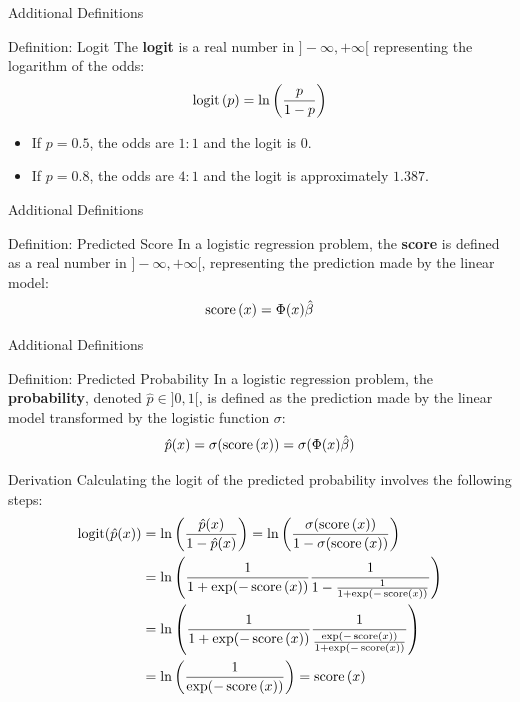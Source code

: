 \begin{frame}{Additional Definitions}
	\begin{block}{Definition: Logit}
		The \textbf{logit} is a real number in $]-\infty, +\infty[$ representing the logarithm of the odds:
		\begin{equation}
			\operatorname{logit}\left(p\right) = \ln\left(\frac{p}{1 - p}\right)
			\nonumber
		\end{equation}
	\end{block}
	\pause
	\begin{itemize}
		\item If $p=0.5$, the odds are $1:1$ and the logit is $0$.
		\item If $p=0.8$, the odds are $4:1$ and the logit is approximately $1.387$.
	\end{itemize}	
\end{frame}

\begin{frame}{Additional Definitions}
	\begin{block}{Definition: Predicted Score}
		In a logistic regression problem, the \textbf{score} is defined as a real number in $]-\infty, +\infty[$, representing the prediction made by the linear model:
		\begin{equation}
			\operatorname{score}\left(x\right) = \Phi(x) \hat{\beta}
			\nonumber
		\end{equation}
	\end{block}
\end{frame}

\begin{frame}{Additional Definitions}
	\begin{block}{Definition: Predicted Probability}
		In a logistic regression problem, the \textbf{probability}, denoted $\hat{p} \in ]0, 1[$, is defined as the prediction made by the linear model transformed by the logistic function $\sigma$:
		\begin{equation}
			\hat{p}(x) = \sigma(\operatorname{score}\left(x\right)) = \sigma(\Phi(x) \hat{\beta})
			\nonumber
		\end{equation}
	\end{block}
\end{frame}

\begin{frame}{Derivation}
	Calculating the logit of the predicted probability involves the following steps:
	\begin{equation}
		\begin{aligned}
			\text{logit}(\hat{p}(x))
			&= \ln\left(\frac{\hat{p}(x)}{1 - \hat{p}(x)}\right)
			= \ln\left(\frac{\sigma(\operatorname{score}\left(x\right))}{1 - \sigma(\operatorname{score}\left(x\right))}\right) \\
			&= \ln\left(\frac{1}{1 + \exp(-\operatorname{score}\left(x\right))} \frac{1}{1 - \frac{1}{1 + \exp(-\operatorname{score}\left(x\right))}}\right) \\
			&= \ln\left(\frac{1}{1 + \exp(-\operatorname{score}\left(x\right))} \frac{1}{\frac{\exp(-\operatorname{score}\left(x\right))}{1 + \exp(-\operatorname{score}\left(x\right))}}\right) \\
			&= \ln\left(\frac{1}{\exp(-\operatorname{score}\left(x\right))}\right) = \operatorname{score}\left(x\right)
		\end{aligned}
		\nonumber
	\end{equation}
\end{frame}

